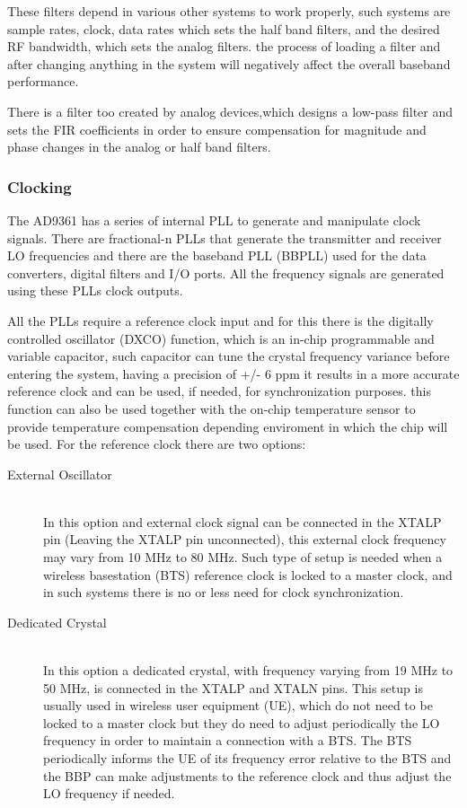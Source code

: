 These filters depend in various other systems to work properly, such systems are sample rates, clock, data rates which sets the half band filters, and the desired RF bandwidth, which sets the analog filters. the process of loading a filter and after changing anything in the system will negatively affect the overall baseband performance.

There is a filter too created by analog devices,which designs a low-pass filter and sets the FIR coefficients in order to ensure compensation for magnitude and phase changes in the analog or half band filters.

\subsubsection{Clocking}

The AD9361 has a series of internal PLL to generate and manipulate clock signals. There are fractional-n PLLs that generate the transmitter and receiver LO frequencies and there are the baseband PLL (BBPLL) used for the data converters, digital filters and I/O ports. All the frequency signals are generated using these PLLs clock outputs.

All the PLLs require a reference clock input and for this there is the digitally controlled oscillator (DXCO) function, which is an in-chip programmable and variable capacitor, such capacitor can tune the crystal frequency variance before entering the system, having a precision of +/- 6 ppm it results in a more accurate reference clock and can be used, if needed, for synchronization purposes. this function can also be used together with the on-chip temperature sensor to provide temperature compensation depending enviroment in which the chip will be used. For the reference clock there are two options:

\begin{description}
	\item[External Oscillator] \hfill \\
	In this option and external clock signal can be connected in the XTALP pin (Leaving the XTALP pin unconnected), this external clock frequency may vary from 10 MHz to 80 MHz. Such type of setup is needed when a wireless basestation (BTS) reference clock is locked to a master clock, and in such systems there is no or less need for clock synchronization.

	\item[Dedicated Crystal] \hfill \\
	In this option a dedicated crystal, with frequency varying from 19 MHz to 50 MHz, is connected in the XTALP and XTALN pins. This setup is usually used in wireless user equipment (UE), which do not need to be locked to a master clock but they do need to adjust periodically the LO frequency in order to maintain a connection with a BTS. The BTS periodically informs the UE of its frequency error relative to the BTS and the BBP can make adjustments to the reference clock and thus adjust the LO frequency if needed.

\end{description}

